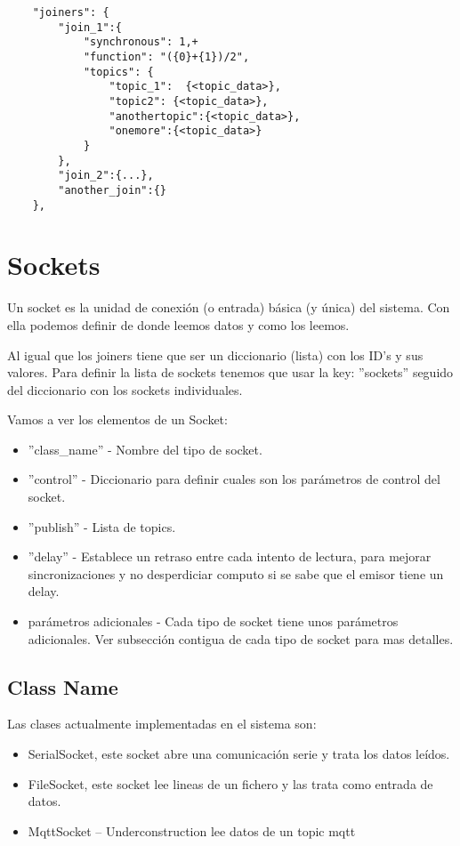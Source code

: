 \documentclass[12pt, a4paper, oneside, titlepage]{article}
\begin{document}
\begin{lstlisting}
	"joiners": {
		"join_1":{
			"synchronous": 1,+
			"function": "({0}+{1})/2", 
			"topics": { 
				"topic_1":  {<topic_data>},
				"topic2": {<topic_data>},
				"anothertopic":{<topic_data>},
				"onemore":{<topic_data>}
			}
		},
		"join_2":{...},
		"another_join":{}
	},
\end{lstlisting}

\section{Sockets}

Un socket es la unidad de conexión (o entrada) básica (y única) del sistema. Con ella podemos definir de donde leemos datos y como los leemos.

Al igual que los joiners tiene que ser un diccionario (lista) con los ID's y sus valores. 
Para definir la lista de sockets tenemos que usar la key: ''sockets'' seguido del diccionario con los sockets individuales.

Vamos a ver los elementos de un Socket:

\begin{itemize}
\item ''class\_name'' - Nombre del tipo de socket. 
\item ''control'' - Diccionario para definir cuales son los parámetros de control del socket.
\item ''publish'' - Lista de topics.
\item ''delay'' - Establece un retraso entre cada intento de lectura, para mejorar sincronizaciones y no desperdiciar computo si se sabe que el emisor tiene un delay.
\item parámetros adicionales - Cada tipo de socket tiene unos parámetros adicionales. Ver subsección contigua de cada tipo de socket para mas detalles.
\end{itemize}

\subsection{Class Name}


Las clases actualmente implementadas en el sistema son:

\begin{itemize}
\item SerialSocket, este socket abre una comunicación serie y trata los datos leídos.
\item FileSocket, este socket lee lineas de un fichero y las trata como entrada de datos.
\item MqttSocket -- Underconstruction lee datos de un topic mqtt
\end{itemize}
\end{document}
